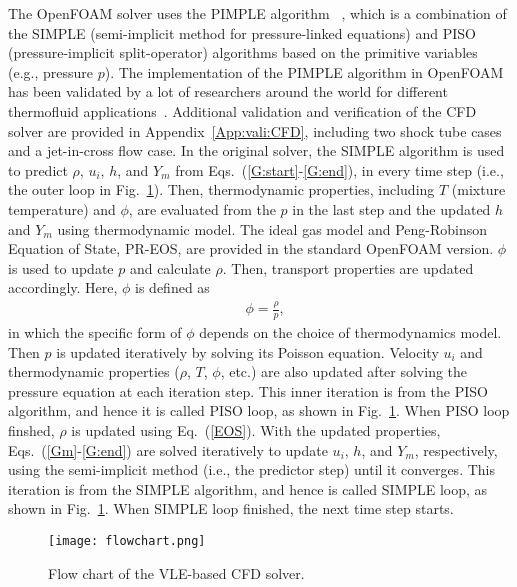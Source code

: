 The OpenFOAM solver uses the PIMPLE algorithm ~\cite{holzmann2016mathematics}, which is a combination of the SIMPLE (semi-implicit method for pressure-linked equations) \cite{patankar1983calculation} and PISO (pressure-implicit split-operator) algorithms \cite{issa1986solution} based on the primitive variables (e.g., pressure $p$). The implementation of the PIMPLE algorithm in OpenFOAM has been validated by a lot of researchers around the world for different thermofluid applications~\cite{robertson2015validation, higuera2014three,gaikwad2019openfoam,gamet2020validation,de2017implementation,ashton2019verification}. Additional validation and verification of the CFD solver are provided in Appendix~\ref{App:vali:CFD}, including two shock tube cases and a jet-in-cross flow case. In the original solver, the SIMPLE algorithm is used to predict $\rho$, $u_i$, $h$, and $Y_m$ from Eqs.~(\ref{G:start}-\ref{G:end}), in every time step (i.e., the outer loop in Fig.~\ref{FC_CFD}). Then, thermodynamic properties, including $T$ (mixture temperature) and $\phi$, are evaluated from the $p$ in the last step and the updated $h$ and $Y_m$ using thermodynamic model. The ideal gas model and Peng-Robinson Equation of State, PR-EOS, are provided in the standard OpenFOAM version. $\phi$ is used to update $p$ and calculate $\rho$. Then, transport properties are updated accordingly. 
Here, $\phi$ is defined as
\begin{align}
     & \phi = \frac{\rho} {p}, \label{EOS}
\end{align}
in which the specific form of $\phi$ depends on the choice of thermodynamics model. Then $p$ is updated iteratively by solving its Poisson equation. Velocity $u_i$ and thermodynamic properties ($\rho$, $T$, $\phi$, etc.) are also updated after solving the pressure equation at each iteration step. This inner iteration is from the PISO algorithm, and hence it is called PISO loop, as shown in Fig.~\ref{FC_CFD}. When PISO loop finshed, $\rho$ is updated using Eq.~(\ref{EOS}). With the updated properties, Eqs.~(\ref{Gm}-\ref{G:end}) are solved iteratively to update $u_i$, $h$, and $Y_m$, respectively, using the semi-implicit method (i.e., the predictor step) until it converges. This iteration is from the SIMPLE algorithm, and hence is called SIMPLE loop, as shown in Fig.~\ref{FC_CFD}. When SIMPLE loop finished, the next time step starts.


\begin{figure}[htbp]
    \centering
    \texttt{[image: flowchart.png]}
    \centering
    \caption{Flow chart of the VLE-based CFD solver.}
    \label{FC_CFD}
\end{figure}

